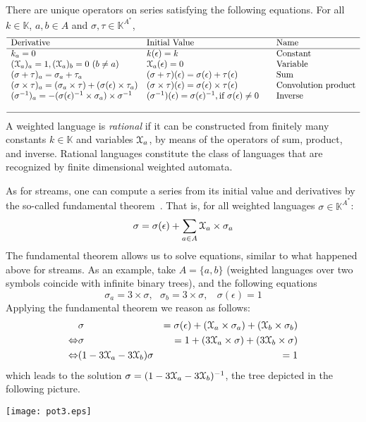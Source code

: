 \documentclass[3p]{elsarticle}
\newcommand{\streamproduct}{\times} %
\newcommand{\K}{\mathbb{K}}            %
\begin{document}
There are unique operators on series satisfying the
following equations. For all $k\in\K$, $a,b \in A$ and
$\sigma,\tau\in \K^{A^*}$,
\[
\begin{array}{lll}
\hline
\text{Derivative}&\text{Initial Value}&\text{Name}\\
\hline
k_a=0&k(\epsilon)=k &\text{Constant}\\
(\Xa)_a = 1, (\Xa)_b = 0\ (b\neq a) & \Xa(\epsilon) = 0 &\text{Variable}\\
(\sigma+\tau)_a = \sigma_a + \tau_a & (\sigma+\tau)(\epsilon) =
\sigma(\epsilon) + \tau(\epsilon)& \text{Sum}\\
(\sigma\streamproduct\tau)_a = (\sigma_a\streamproduct\tau) +
(\sigma(\epsilon)\streamproduct\tau_a) &
(\sigma\streamproduct\tau)(\epsilon) =
\sigma(\epsilon) \streamproduct \tau(\epsilon)& \text{Convolution product}\\
(\sigma^{-1})_a = -
(\sigma(\epsilon)^{-1}\streamproduct\sigma_a)\streamproduct\sigma^{-1}
&
(\sigma^{-1})(\epsilon) =\sigma(\epsilon)^{-1}, \text{if }
\sigma(\epsilon)\neq 0\ \ \ & \text{Inverse}\\
\\
\hline
\end{array}
\]
A weighted language is \emph{rational} if it can be constructed from
finitely many constants $k\in\K$ and variables $\mathcal{X}_a$, by means of
the operators of sum, product, and inverse. Rational languages constitute the
class of languages that are recognized by finite dimensional weighted automata.



As for streams, one can compute a series from its initial value and
derivatives by the so-called fundamental
theorem~\cite{Rutten2003-behavioural-differential-equations}. That is,
for all weighted
languages $\sigma\in\K^{A^*}$:
\begin{eqnarray}\label{ft-series}
\sigma = \sigma(\epsilon) + \sum_{a\in A} \Xa\streamproduct
\sigma_a
\end{eqnarray}
The fundamental theorem allows us to solve equations, similar to
what happened above for streams. As an example, take $A= \{a,b\}$
(weighted languages over two symbols coincide with infinite binary
trees), and the following equations
\[
\sigma_a = 3\streamproduct \sigma,\ \ \ \sigma_b=3\streamproduct
\sigma, \ \ \ \ \sigma(\epsilon) = 1
\]
Applying the fundamental theorem we reason as follows:
\begin{eqnarray*}
& \sigma &=  \sigma(\epsilon)+(\Xa\streamproduct \sigma_a)+(\Xb\streamproduct \sigma_b)\\
\Leftrightarrow& \sigma&=
1+(3\Xa\streamproduct \sigma)+(3\Xb\streamproduct \sigma)\\
\Leftrightarrow&(1-3\Xa-3\Xb) \sigma&= 1\\
\end{eqnarray*}
which leads to the solution $\sigma = (1-3\mathcal{X}_a-3\mathcal{X}_b)^{-1}$, the
tree depicted in the following picture.
\begin{center}
\texttt{[image: pot3.eps]}
\end{center}
\end{document}
